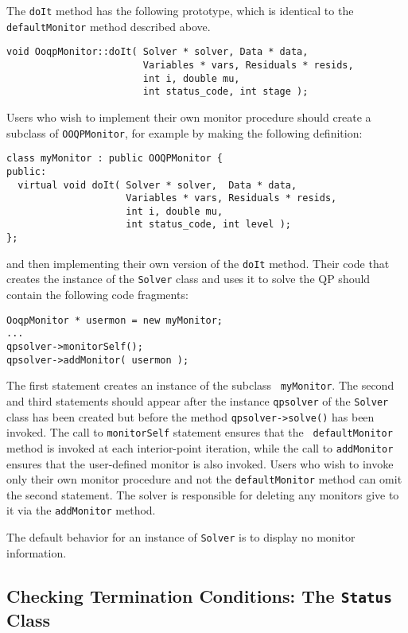 The \texttt{doIt} method has the following prototype, which is
identical to the {\tt defaultMonitor} method described above.
\begin{verbatim}
void OoqpMonitor::doIt( Solver * solver, Data * data, 
                        Variables * vars, Residuals * resids,
                        int i, double mu, 
                        int status_code, int stage );
\end{verbatim}
Users who wish to implement their own monitor procedure should create
a subclass of {\tt OOQPMonitor}, for example by making the following
definition:
\begin{verbatim}
class myMonitor : public OOQPMonitor {
public:
  virtual void doIt( Solver * solver,  Data * data,
                     Variables * vars, Residuals * resids,
                     int i, double mu,
                     int status_code, int level );
};
\end{verbatim}
and then implementing their own version of the {\tt doIt}
method. Their code that creates the instance of the {\tt Solver} class
and uses it to solve the QP should contain the following code
fragments:
\begin{verbatim}
OoqpMonitor * usermon = new myMonitor;
...
qpsolver->monitorSelf();
qpsolver->addMonitor( usermon );
\end{verbatim}
The first statement creates an instance of the subclass {\tt
  myMonitor}. The second and third statements should appear after the
instance {\tt qpsolver} of the {\tt Solver} class has been created but
before the method {\tt qpsolver->solve()} has been invoked. The call
to \texttt{monitorSelf} statement ensures that the {\tt
  defaultMonitor} method is invoked at each interior-point iteration,
while the call to \texttt{addMonitor} ensures that the user-defined
monitor is also invoked. Users who wish to invoke only their own
monitor procedure and not the {\tt defaultMonitor} method can omit the
second statement. The solver is responsible for deleting any monitors
  give to it via the \texttt{addMonitor} method.

The default behavior for an instance of \texttt{Solver} is to
display no monitor information.



\subsection{Checking Termination Conditions: The {\tt Status} Class}
\label{sec.status}

